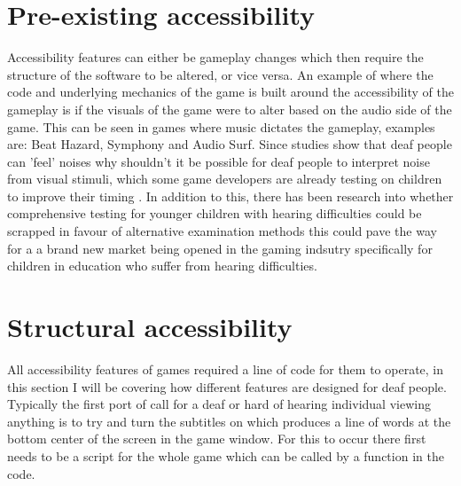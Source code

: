 \documentclass{scrartcl}
\begin{document}
\section{Pre-existing accessibility}
Accessibility features can either be gameplay changes which then require the structure of the software to be altered, or vice versa. An example of where the code and underlying mechanics of the game is built around the accessibility of the gameplay is if the visuals of the game were to alter based on the audio side of the game. This can be seen in games where music dictates the gameplay, examples are: Beat Hazard\cite {game:beathazard}, Symphony\cite {game:symphony} and Audio Surf\cite {game:audiosurf}. Since studies show that deaf people can 'feel' noises \cite {Nanayakkara} why shouldn't it be possible for deaf people to interpret noise from visual stimuli, which some game developers are already testing on children to improve their timing  \cite {Jouhtimak}. In addition to this, there has been research into whether comprehensive testing for younger children with hearing difficulties could be scrapped in favour of alternative examination methods \cite {Mich} this could pave the way for a a brand new market being opened in the gaming indsutry specifically for children in education who suffer from hearing difficulties.

\section{Structural accessibility}
All accessibility features of games required a line of code for them to operate, in this section I will be covering how different features are designed for deaf people.
Typically the first port of call for a deaf or hard of hearing individual viewing anything is to try and turn the subtitles on which produces a line of words at the bottom center of the screen in the game window. For this to occur there first needs to be a script for the whole game which can be called by a function in the code.



\end{document}
